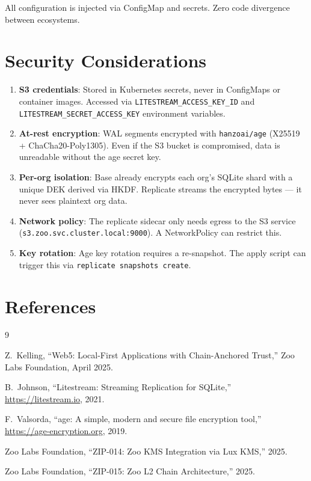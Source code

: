 \documentclass[twocolumn,11pt]{article}
\begin{document}
All configuration is injected via ConfigMap and secrets.
Zero code divergence between ecosystems.

\section{Security Considerations}

\begin{enumerate}
\item \textbf{S3 credentials}: Stored in Kubernetes secrets,
  never in ConfigMaps or container images.  Accessed via
  \texttt{LITESTREAM\_ACCESS\_KEY\_ID} and
  \texttt{LITESTREAM\_SECRET\_ACCESS\_KEY} environment variables.

\item \textbf{At-rest encryption}: WAL segments encrypted with
  \texttt{hanzoai/age} (X25519 + ChaCha20-Poly1305).  Even if
  the S3 bucket is compromised, data is unreadable without the
  age secret key.

\item \textbf{Per-org isolation}: Base already encrypts each
  org's SQLite shard with a unique DEK derived via HKDF.
  Replicate streams the encrypted bytes --- it never sees
  plaintext org data.

\item \textbf{Network policy}: The replicate sidecar only needs
  egress to the S3 service (\texttt{s3.zoo.svc.cluster.local:9000}).
  A NetworkPolicy can restrict this.

\item \textbf{Key rotation}: Age key rotation requires a
  re-snapshot.  The apply script can trigger this via
  \texttt{replicate snapshots create}.
\end{enumerate}

\section{References}

\begin{thebibliography}{9}

Z.~Kelling, ``Web5: Local-First Applications with Chain-Anchored
Trust,'' Zoo Labs Foundation, April 2025.

B.~Johnson, ``Litestream: Streaming Replication for SQLite,''
\url{https://litestream.io}, 2021.

F.~Valsorda, ``age: A simple, modern and secure file encryption
tool,'' \url{https://age-encryption.org}, 2019.

Zoo Labs Foundation, ``ZIP-014: Zoo KMS Integration via Lux KMS,''
2025.

Zoo Labs Foundation, ``ZIP-015: Zoo L2 Chain Architecture,''
2025.

\end{thebibliography}
\end{document}

